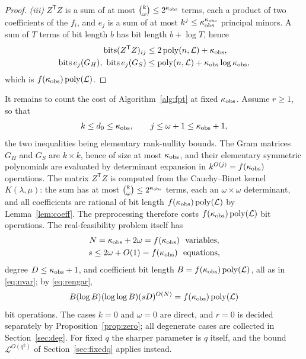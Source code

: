 \documentclass[journal]{IEEEtran}
\theoremstyle{plainn}
\theoremstyle{remark}
\begin{document}
\begin{proof}
\emph{(iii)} $Z^{\mathsf T}Z$ is a sum of at most
$\binom{k}{\omega}\le2^{\kappa_{\rm obs}}$ terms, each a product of two
coefficients of the $f_i$, and $e_j$ is a sum of at most
$k^{j}\le\kappa_{\rm obs}^{\kappa_{\rm obs}}$ principal minors. A sum of $T$
terms of bit length $b$ has bit length $b+\log T$, hence
\begin{equation*}
\begin{aligned}
\operatorname{bits}(Z^{\mathsf T}Z)_{ij}
&\le2\operatorname{poly}(n,\mathcal L)+\kappa_{\rm obs},\\
\operatorname{bits}e_j(G_H),\ \operatorname{bits}e_j(G_S)
&\le\operatorname{poly}(n,\mathcal L)+\kappa_{\rm obs}\log\kappa_{\rm obs},
\end{aligned}
\end{equation*}
which is $f(\kappa_{\rm obs})\operatorname{poly}(\mathcal L)$.
\end{proof}

It remains to count the cost of Algorithm~\ref{alg:fpt} at fixed
$\kappa_{\rm obs}$. Assume $r\ge1$, so that
\begin{equation*}
k\le d_0\le\kappa_{\rm obs},\qquad j\le\omega+1\le\kappa_{\rm obs}+1,
\end{equation*}
the two inequalities being elementary rank-nullity bounds. The Gram matrices
$G_H$ and $G_S$ are $k\times k$, hence of size at most
$\kappa_{\rm obs}$, and their elementary symmetric polynomials are evaluated by
determinant expansion in $k^{O(j)}=f(\kappa_{\rm obs})$ operations. The matrix
$Z^{\mathsf T}Z$ is computed from the Cauchy--Binet kernel $K(\lambda,\mu)$: the
sum has at most $\binom{k}{\omega}\le2^{\kappa_{\rm obs}}$ terms, each an
$\omega\times\omega$ determinant, and all coefficients are rational of bit length
$f(\kappa_{\rm obs})\operatorname{poly}(\mathcal L)$ by Lemma~\ref{lem:coeff}.
The preprocessing therefore costs
$f(\kappa_{\rm obs})\operatorname{poly}(\mathcal L)$ bit operations. The
real-feasibility problem itself has
\begin{equation*}
\begin{gathered}
N=\kappa_{\rm obs}+2\omega=f(\kappa_{\rm obs})\ \text{ variables},\\
s\le2\omega+O(1)=f(\kappa_{\rm obs})\ \text{ equations},
\end{gathered}
\end{equation*}
degree $D\le\kappa_{\rm obs}+1$, and coefficient bit length
$B=f(\kappa_{\rm obs})\operatorname{poly}(\mathcal L)$, all as in
\eqref{eq:nvar}; by \eqref{eq:rengar},
\begin{equation*}
B(\log B)(\log\log B)(sD)^{O(N)}
=f(\kappa_{\rm obs})\operatorname{poly}(\mathcal L)
\end{equation*}
bit operations. The cases $k=0$ and $\omega=0$ are direct, and $r=0$ is decided
separately by Proposition~\ref{prop:zero}; all degenerate cases are collected in
Section~\ref{sec:deg}. For fixed $q$ the sharper parameter is $q$ itself, and the
bound $\mathcal L^{O(q^2)}$ of Section~\ref{sec:fixedq} applies instead.
\end{document}
